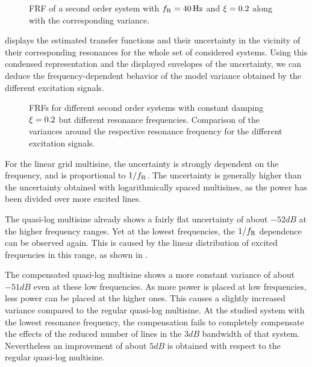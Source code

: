   \begin{figure}[th]
    \centering
    \setlength\figureheight{5cm}
    \setlength{}
    
    \caption[Simulated FRF and its variance for different excitation signals.]{FRF of a second order system with $f_{\mathrm{R}}=40\,\mathrm{Hz}$ and $\damping=0.2$
             along with the corresponding variance.}%
    \label{fig:FRF1}
  \end{figure}

   displays the estimated transfer functions and their uncertainty in the vicinity of their corresponding resonances for the whole set of considered systems.
  Using this condensed representation and the displayed envelopes of the uncertainty, we can deduce the frequency-dependent behavior of the model variance obtained by the different excitation signals.

  \begin{figure}%
    \centering
    \setlength\figureheight{5cm}
    \setlength{}
    
    \caption[Simulated FRFs and their variances of systems with $\damping=0.2$ for different excitation signals.]{FRFs for different second order systems with constant damping
             $\damping=0.2$ but different resonance frequencies. Comparison of the
             variances around the respective resonance frequency for the different
             excitation signals.}%
    \label{fig:damping02}
  \end{figure}

  For the linear grid multisine, the uncertainty is strongly dependent on the frequency, and is proportional to $1/f_{\mathrm{R}}$.
  The uncertainty is generally higher than the uncertainty obtained with logarithmically spaced multisines, as the power has been divided over more excited lines.

  The quasi-log multisine already shows a fairly flat uncertainty of about $-52 \unit{dB}$ at the higher frequency ranges.
  Yet at the lowest frequencies, the $1/f_{\mathrm{R}}$ dependence can be observed again.
  This is caused by the linear distribution of excited frequencies in this range, as shown in .

  The compensated quasi-log multisine shows a more constant variance of about $-51 \unit{dB}$ even at these low frequencies.
  As more power is placed at low frequencies, less power can be placed at the higher ones.
  This causes a slightly increased variance compared to the regular quasi-log multisine.
  At the studied system with the lowest resonance frequency, the compensation fails to completely compensate the effects of the reduced number of lines in the $3\unit{dB}$ bandwidth of that system.
  Nevertheless an improvement of about $5\unit{dB}$ is obtained with respect to the regular quasi-log multisine.

